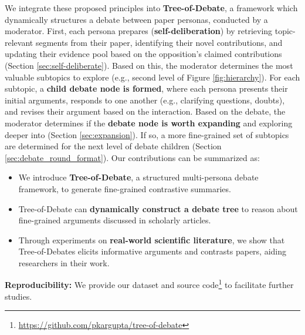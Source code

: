 

\par We integrate these proposed principles into \textbf{Tree-of-Debate}, a framework which dynamically structures a debate between paper personas, conducted by a moderator. First, each persona prepares (\textbf{self-deliberation}) by retrieving topic-relevant segments from their paper, identifying their novel contributions, and updating their evidence pool based on the opposition's claimed contributions (Section \ref{sec:self-deliberate}). Based on this, the moderator determines the most valuable subtopics to explore (e.g., second level of Figure \ref{fig:hierarchy}). For each subtopic, a \textbf{child debate node is formed}, where each persona presents their initial arguments, responds to one another (e.g., clarifying questions, doubts), and revises their argument based on the interaction. Based on the debate, the moderator determines if the \textbf{debate node is worth expanding} and exploring deeper into (Section \ref{sec:expansion}). If so, a more fine-grained set of subtopics are determined for the next level of debate children (Section \ref{sec:debate_round_format}). Our contributions can be summarized as: 
\begin{itemize}
    \itemsep-0.1em
    \item We introduce \textbf{Tree-of-Debate}, a structured multi-persona debate framework, to generate fine-grained contrastive summaries.  
    \item Tree-of-Debate can \textbf{dynamically construct a debate tree} to reason about fine-grained arguments discussed in scholarly articles. 
    \item Through experiments on \textbf{real-world scientific literature}, we show that Tree-of-Debates elicits informative arguments and contrasts papers, aiding researchers in their work. 
\end{itemize}

\textbf{Reproducibility:} We provide our dataset and source code\footnote{\url{https://github.com/pkargupta/tree-of-debate}} to facilitate further studies.